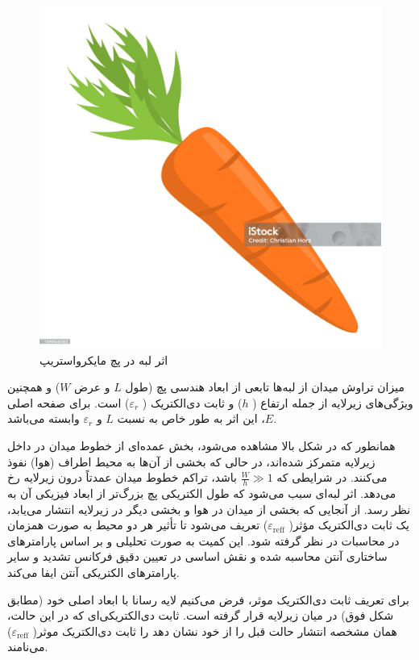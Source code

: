 \begin{figure}
	\centering
	\includegraphics[scale=0.3]{Images/aaa.jpg}
	\caption{اثر لبه در پچ مایکرواستریپ}
	\label{fig8}
\end{figure}

میزان تراوش میدان از لبه‌ها تابعی از ابعاد هندسی پچ (طول
$L$
 و عرض
$W$)
 و همچنین ویژگی‌های زیرلایه از جمله ارتفاع (
$h$)
 و ثابت دی‌الکتریک (
 $\varepsilon_r$)
 است. برای صفحه اصلی
 $E$،
  این اثر به طور خاص به نسبت
$L$
  و
$\varepsilon_r$
 وابسته می‌باشد.


همانطور که در شکل بالا مشاهده می‌شود، بخش عمده‌ای از خطوط میدان در داخل زیرلایه متمرکز شده‌اند، در حالی که بخشی از آن‌ها به محیط اطراف (هوا) نفوذ می‌کنند. در شرایطی که
$ \frac{W}{h} \gg 1$
 باشد، تراکم خطوط میدان عمدتاً درون زیرلایه رخ می‌دهد. اثر لبه‌ای سبب می‌شود که طول الکتریکی پچ بزرگ‌تر از ابعاد فیزیکی آن به نظر رسد. از آنجایی که بخشی از میدان در هوا و بخشی دیگر در زیرلایه انتشار می‌یابد، یک ثابت دی‌الکتریک مؤثر(
$\varepsilon_{\text{reff}}$)
 تعریف می‌شود تا تأثیر هر دو محیط به صورت همزمان در محاسبات در نظر گرفته شود. این کمیت به صورت تحلیلی و بر اساس پارامترهای ساختاری آنتن محاسبه شده و نقش اساسی در تعیین دقیق فرکانس تشدید و سایر پارامترهای الکتریکی آنتن ایفا می‌کند.


برای تعریف ثابت دی‌الکتریک موثر، فرض می‌کنیم لایه رسانا با ابعاد اصلی خود (مطابق شکل فوق) در میان زیرلایه قرار گرفته است. ثابت دی‌الکتریکی‌ای که در این حالت، همان مشخصه انتشار حالت قبل را از خود نشان دهد را ثابت دی‌الکتریک موثر(
$\varepsilon_{\text{reff}}$)
می‌نامند.


